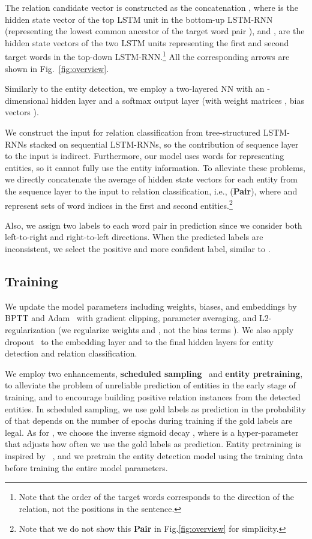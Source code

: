 \documentclass[11pt]{article}
\begin{document}
The relation candidate vector is constructed as the concatenation , where  is the hidden state vector of the top LSTM unit in the bottom-up LSTM-RNN (representing the lowest common ancestor of the target word pair ), and ,  are the hidden state vectors of the two LSTM units representing the first and second target words in the top-down LSTM-RNN.\footnote{Note that the order of the target words corresponds to the direction of the relation, not the positions in the sentence.} All the corresponding arrows are shown in Fig.~\ref{fig:overview}.

Similarly to the entity detection, we employ a two-layered NN with an -dimensional hidden layer  and a softmax output layer (with weight matrices , bias vectors ).


We construct the input  for relation classification from tree-structured LSTM-RNNs stacked on sequential LSTM-RNNs, 
so the contribution of sequence layer to the input is indirect. 
Furthermore, our model uses words for representing entities, so it cannot fully use the entity information.  
To alleviate these problems, we directly concatenate the average of hidden state vectors for each entity from the sequence layer to the input  to relation classification, i.e.,  ({\bf Pair}), where  and  represent sets of word indices in the first and second entities.\footnote{Note that we do not show this {\bf Pair} in Fig.\ref{fig:overview} for simplicity.} 

Also, we assign two labels to each word pair in prediction since we consider both left-to-right and right-to-left directions. When the predicted labels are inconsistent, we select the positive and more confident label, similar to .

\subsection{Training}

We update the model parameters including weights, biases, and embeddings by BPTT and Adam~\cite{kingma2014adam} with
gradient clipping, parameter averaging, and L2-regularization (we regularize weights  and , not the bias terms ). We also apply dropout~\cite{srivastava2014dropout} 
to the embedding layer and to the final hidden layers for entity detection and relation classification.

We employ two enhancements, \textbf{scheduled sampling}~\cite{bengio2015scheduled} and \textbf{entity pretraining}, to alleviate the problem of unreliable prediction of entities in the early stage of training, and to encourage building positive relation instances from the detected entities. In scheduled sampling, we use gold labels as prediction in the probability of  that depends on the number of epochs  during training if the gold labels are legal.
As for , we choose the inverse sigmoid decay , where  is a hyper-parameter that adjusts how often we use the gold labels as prediction. Entity pretraining is inspired by ~\cite{PentinaSL15}, and we pretrain the entity detection model using the training data before training the entire model parameters. 
\end{document}

